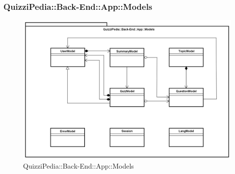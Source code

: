\subsubsection{QuizziPedia::Back-End::App::Models}

\label{QuizziPedia::Back-End::App::Models}
\begin{figure}[ht]
	\centering
	\includegraphics[scale=0.4]{UML/Package/QuizziPedia_Back-End_App_Models.png}
	\caption{QuizziPedia::Back-End::App::Models}
\end{figure}
\FloatBarrier
